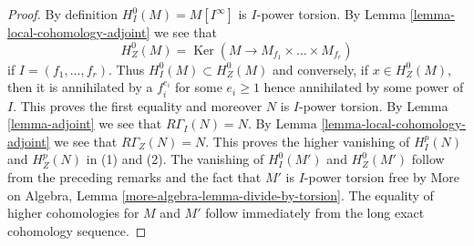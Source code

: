 \documentclass[10pt,a4paper]{amsart}
\theoremstyle{plain}
\theoremstyle{definition}
\theoremstyle{remark}
\numberwithin{equation}{subsection}
\def\Ker{\mathop{\mathrm{Ker}}}
\begin{document}
\begin{proof}
By definition $H^0_I(M) = M[I^\infty]$ is $I$-power torsion.
By Lemma \ref{lemma-local-cohomology-adjoint} we see that
$$
H^0_Z(M) = \Ker(M \longrightarrow M_{f_1} \times \ldots \times M_{f_r})
$$
if $I = (f_1, \ldots, f_r)$. Thus $H^0_I(M) \subset H^0_Z(M)$ and
conversely, if $x \in H^0_Z(M)$, then it is annihilated by a $f_i^{e_i}$
for some $e_i \geq 1$ hence annihilated by some power of $I$.
This proves the first equality and moreover $N$ is $I$-power torsion.
By Lemma \ref{lemma-adjoint} we see that $R\Gamma_I(N) = N$.
By Lemma \ref{lemma-local-cohomology-adjoint} we see that $R\Gamma_Z(N) = N$.
This proves the higher vanishing of $H^p_I(N)$ and $H^p_Z(N)$ in (1) and (2).
The vanishing of $H^0_I(M')$ and $H^0_Z(M')$ follow from the preceding
remarks and the fact that $M'$ is $I$-power torsion free by
More on Algebra, Lemma \ref{more-algebra-lemma-divide-by-torsion}.
The equality of higher cohomologies for $M$ and $M'$ follow
immediately from the long exact cohomology sequence.
\end{proof}
\end{document}
